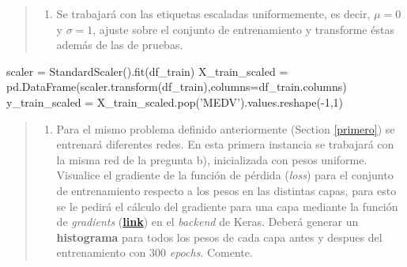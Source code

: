 \documentclass[11pt]{article}
\providecommand{\tightlist}{%
      \setlength{\itemsep}{0pt}\setlength{\parskip}{0pt}}
\newenvironment{Shaded}{}{}
\newcommand{\DecValTok}[1]{\textcolor[rgb]{0.25,0.63,0.44}{{#1}}}
\newcommand{\StringTok}[1]{\textcolor[rgb]{0.25,0.44,0.63}{{#1}}}
\newcommand{\NormalTok}[1]{{#1}}
\newcommand{\OperatorTok}[1]{\textcolor[rgb]{0.40,0.40,0.40}{{#1}}}
\begin{document}
\begin{quote}
\begin{enumerate}
\def\labelenumi{\alph{enumi})}
\tightlist
\item
  Se trabajará con las etiquetas escaladas uniformemente, es decir,
  \(\mu=0\) y \(\sigma=1\), ajuste sobre el conjunto de entrenamiento y
  transforme éstas además de las de pruebas.
\end{enumerate}
\end{quote}

\begin{Shaded}
\begin{Highlighting}[]
\NormalTok{scaler }\OperatorTok{=}\NormalTok{ StandardScaler().fit(df_train)}
\NormalTok{X_train_scaled }\OperatorTok{=}\NormalTok{ pd.DataFrame(scaler.transform(df_train),columns}\OperatorTok{=}\NormalTok{df_train.columns)}
\NormalTok{y_train_scaled }\OperatorTok{=}\NormalTok{ X_train_scaled.pop(}\StringTok{'MEDV'}\NormalTok{).values.reshape(}\OperatorTok{-}\DecValTok{1}\NormalTok{,}\DecValTok{1}\NormalTok{)}
\end{Highlighting}
\end{Shaded}

\begin{quote}
\begin{enumerate}
\def\labelenumi{\alph{enumi})}
\setcounter{enumi}{1}
\tightlist
\item
  Para el mismo problema definido anteriormente (Section \ref{primero})
  se entrenará diferentes redes. En esta primera instancia se trabajará
  con la misma red de la pregunta b), inicializada con pesos uniforme.
  Visualice el gradiente de la función de pérdida (\emph{loss}) para el
  conjunto de entrenamiento respecto a los pesos en las distintas capas,
  para esto se le pedirá el cálculo del gradiente para una capa mediante
  la función de \emph{gradients}
  (\textbf{\href{https://www.tensorflow.org/api_docs/python/tf/keras/backend/gradients}{link}})
  en el \emph{backend} de Keras. Deberá generar un \textbf{histograma}
  para todos los pesos de cada capa antes y despues del entrenamiento
  con 300 \emph{epochs}. Comente.
\end{enumerate}
\end{quote}
\end{document}
